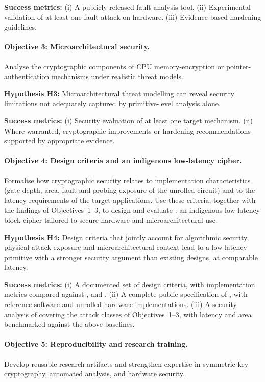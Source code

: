 \textbf{Success metrics:}
(i) A publicly released fault-analysis tool.
(ii) Experimental validation of at least one fault attack on hardware.
(iii) Evidence-based hardening guidelines.

\paragraph{Objective 3: Microarchitectural security.}
Analyse the cryptographic components of CPU memory-encryption
or pointer-authentication mechanisms under realistic threat models.

\textbf{Hypothesis H3:}
Microarchitectural threat modelling can reveal security limitations
not adequately captured by primitive-level analysis alone.

\textbf{Success metrics:}
(i) Security evaluation of at least one target mechanism.
(ii) Where warranted, cryptographic improvements or hardening recommendations supported by appropriate evidence.

\paragraph{Objective 4: Design criteria and an indigenous low-latency cipher.}
Formalise how cryptographic security relates to implementation characteristics (gate depth, area, fault and probing exposure of the unrolled circuit) and to the latency requirements of the target applications.
Use these criteria, together with the findings of Objectives~1--3, to design and evaluate : an indigenous low-latency block cipher tailored to secure-hardware and microarchitectural use.

\textbf{Hypothesis H4:}
Design criteria that jointly account for algorithmic security, physical-attack exposure and microarchitectural context lead to a low-latency primitive with a stronger security argument than existing designs, at comparable latency.

\textbf{Success metrics:}
(i) A documented set of design criteria, with implementation metrics compared against ,  and .
(ii) A complete public specification of , with reference software and unrolled hardware implementations.
(iii) A security analysis of  covering the attack classes of Objectives~1--3, with latency and area benchmarked against the above baselines.

\paragraph{Objective 5: Reproducibility and research training.}
Develop reusable research artifacts and strengthen expertise
in symmetric-key cryptography, automated analysis, and hardware security.

